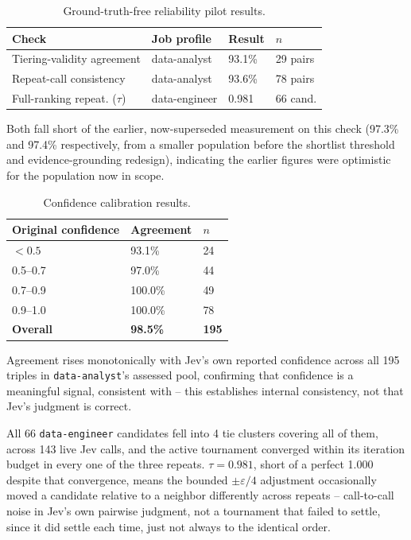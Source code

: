 \documentclass[journal]{IEEEtran}
\begin{document}
\begin{table}[H]
\caption{Ground-truth-free reliability pilot results.}
\label{tab_reliability}
\centering
\scriptsize
\begin{tabular}{p{1.5in}p{0.75in}p{0.5in}p{0.45in}}
\hline
Check & Job profile & Result & $n$\\
\hline
Tiering-validity agreement & data-analyst & 93.1\% & 29 pairs\\
Repeat-call consistency & data-analyst & 93.6\% & 78 pairs\\
Full-ranking repeat. ($\tau$) & data-engineer & 0.981 & 66 cand.\\
\hline
\end{tabular}
\end{table}
Both fall short of the earlier, now-superseded measurement on this check (97.3\% and 97.4\% respectively, from a smaller population before the shortlist threshold and evidence-grounding redesign), indicating the earlier figures were optimistic for the population now in scope.

\begin{table}[H]
\caption{Confidence calibration results.}
\label{tab_calibration}
\centering
\scriptsize
\begin{tabular}{p{1.1in}p{0.65in}p{0.55in}}
\hline
Original confidence & Agreement & $n$\\
\hline
$<0.5$ & 93.1\% & 24\\
0.5--0.7 & 97.0\% & 44\\
0.7--0.9 & 100.0\% & 49\\
0.9--1.0 & 100.0\% & 78\\
\hline
\textbf{Overall} & \textbf{98.5\%} & \textbf{195}\\
\hline
\end{tabular}
\end{table}
Agreement rises monotonically with Jev's own reported confidence across all 195 triples in \texttt{data-analyst}'s assessed pool, confirming that confidence is a meaningful signal, consistent with \cite{ref6} -- this establishes internal consistency, not that Jev's judgment is correct.

All 66 \texttt{data-engineer} candidates fell into 4 tie clusters covering all of them, across 143 live Jev calls, and the active tournament converged within its iteration budget in every one of the three repeats. $\tau=0.981$, short of a perfect 1.000 despite that convergence, means the bounded $\pm\varepsilon/4$ adjustment occasionally moved a candidate relative to a neighbor differently across repeats -- call-to-call noise in Jev's own pairwise judgment, not a tournament that failed to settle, since it did settle each time, just not always to the identical order.
\end{document}
